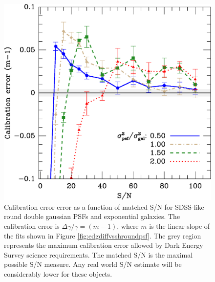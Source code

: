 \documentclass[10pt,preprint]{aastex}
\newcommand{\psf}{PSF}
\begin{document}
\begin{figure}[t] \centering
 \centering 
 \includegraphics[scale=0.65]{figures/set-s2n-edg02-m-vs-shear.eps}

 \caption{Calibration error error as a function of matched S/N for SDSS-like
 round double gaussian \psf s and exponential galaxies.  The calibration error is
 $\Delta \gamma/\gamma = (m-1)$, where $m$ is the linear slope of the fits shown in
 Figure \ref{fig:edgdiffvsshroundpsf}.  The grey region represents the 
 maximum calibration error allowed by Dark Energy Survey science
 requirements.  The matched S/N is the maximal possible S/N measure.  Any real
 world S/N estimate will be considerably lower for these objects.} 

 \label{fig:edgcaliberr}

\end{figure}
\end{document}
